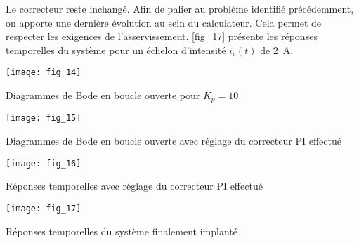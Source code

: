 \ifprof
\else

Le correcteur reste inchangé. Afin de palier au problème identifié précédemment, on apporte une dernière évolution au sein du calculateur. Cela permet de respecter les exigences de l’asservissement. \autoref{fig_17} présente les réponses temporelles du système pour un échelon d’intensité $i_c(t)$ de \SI{2}{A}.
\fi



\ifprof
\else
\begin{marginfigure}
\texttt{[image: fig\_14]}
\caption{Diagrammes de Bode en boucle ouverte pour $K_p = 10$\label{fig_14}}
\end{marginfigure}


\begin{marginfigure}
\texttt{[image: fig\_15]}
\caption{Diagrammes de Bode en boucle ouverte avec réglage du correcteur PI effectué \label{fig_15}}
\end{marginfigure}

\begin{marginfigure}
\texttt{[image: fig\_16]}
\caption{Réponses temporelles avec réglage du correcteur PI effectué \label{fig_16}}
\end{marginfigure}


\begin{marginfigure}
\texttt{[image: fig\_17]}
\caption{Réponses temporelles du système finalement implanté\label{fig_17}}
\end{marginfigure}
\fi


\ifprof
\else
{}
\fi
